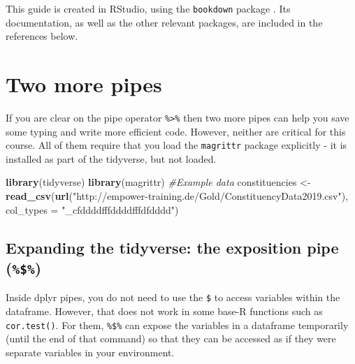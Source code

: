 \documentclass[
]{book}
\newenvironment{Shaded}{\begin{snugshade}}{\end{snugshade}}
\newcommand{\CommentTok}[1]{\textcolor[rgb]{0.56,0.35,0.01}{\textit{#1}}}
\newcommand{\DataTypeTok}[1]{\textcolor[rgb]{0.13,0.29,0.53}{#1}}
\newcommand{\KeywordTok}[1]{\textcolor[rgb]{0.13,0.29,0.53}{\textbf{#1}}}
\newcommand{\NormalTok}[1]{#1}
\newcommand{\OperatorTok}[1]{\textcolor[rgb]{0.81,0.36,0.00}{\textbf{#1}}}
\newcommand{\StringTok}[1]{\textcolor[rgb]{0.31,0.60,0.02}{#1}}
\begin{document}
This guide is created in RStudio, using the \texttt{bookdown} package \citep{R-bookdown}. Its documentation, as well as the other relevant packages, are included in the references below.

\hypertarget{refs}{}

\hypertarget{two-more-pipes}{%
\chapter{Two more pipes}\label{two-more-pipes}}

If you are clear on the pipe operator \texttt{\%\textgreater{}\%} then two more pipes can help you save some typing and write more efficient code. However, neither are critical for this course. All of them require that you load the \texttt{magrittr} package explicitly - it is installed as part of the tidyverse, but not loaded.

\begin{Shaded}
\begin{Highlighting}[]
\KeywordTok{library}\NormalTok{(tidyverse)}
\KeywordTok{library}\NormalTok{(magrittr)}
\CommentTok{#Example data}
\NormalTok{constituencies <-}\StringTok{ }\KeywordTok{read_csv}\NormalTok{(}\KeywordTok{url}\NormalTok{(}\StringTok{"http://empower-training.de/Gold/ConstituencyData2019.csv"}\NormalTok{),}
                           \DataTypeTok{col_types =} \StringTok{"_cfddddfffddddfffdfdddd"}\NormalTok{)}
\end{Highlighting}
\end{Shaded}

\hypertarget{expanding-the-tidyverse-the-exposition-pipe}{%
\section{\texorpdfstring{Expanding the tidyverse: the exposition pipe (\texttt{\%\$\%})}{Expanding the tidyverse: the exposition pipe (\%\$\%)}}\label{expanding-the-tidyverse-the-exposition-pipe}}

Inside dplyr pipes, you do not need to use the \texttt{\$} to access variables within the dataframe. However, that does not work in some base-R functions such as \texttt{cor.test()}. For them, \texttt{\%\$\%} can expose the variables in a dataframe temporarily (until the end of that command) so that they can be accessed as if they were separate variables in your environment.

\begin{Shaded}
\end{Shaded}
\end{document}
